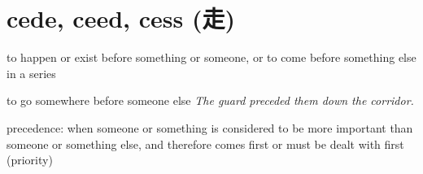 \chapter{cede, ceed, cess (走)}

\begin{vocabulary}[excessive]
\end{vocabulary}

\begin{vocabulary}[exceed]
\end{vocabulary}

\begin{vocabulary}[proceed]
\end{vocabulary}

\begin{vocabulary}
    to happen or exist before something or someone, or to come before something else in a series

    to go somewhere before someone else
    \textit{The guard preceded them down the corridor.}

    precedence: when someone or something is considered to be more important than someone or something else, and therefore comes first or must be dealt with first (priority)
\end{vocabulary}